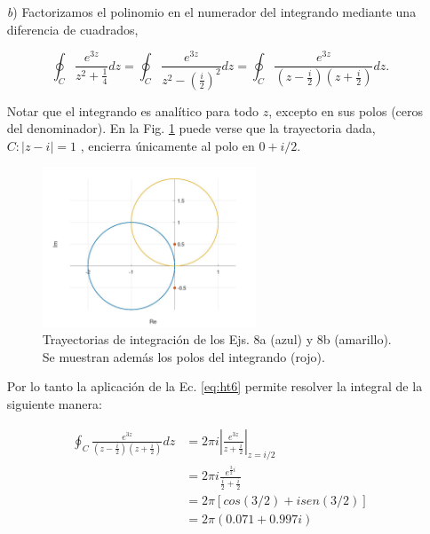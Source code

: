 \documentclass[10pt,a4paper]{article}
\begin{document}
\begin{enumerate}
\begin{enumerate}
\item [\textit{b})]
\label{ej:sol8b}
Factorizamos el polinomio en el numerador del integrando mediante una 
diferencia de cuadrados,

	\begin{equation}
	\oint_{C}\frac{e^{3z}}{z^2+\frac{1}{4}}dz=\oint_{C}\frac{e^{3z}}{z^2-(\frac{i}{2})^2}dz=
	\oint_{C}\frac{e^{3z}}{(z-\frac{i}{2})(z+\frac{i}{2})}dz.
	\end{equation}

Notar que el integrando es anal\'itico para todo $z$, excepto en sus polos 
(ceros del denominador). En la Fig. \ref{fig:sol8} puede verse que la 
trayectoria dada,  $C:|z-i|=1$ , encierra \'unicamente al polo en $0+i/2$.

	\begin{figure}[!htbp]
	\centering
	\includegraphics[width=0.6\textwidth]{8a_b.jpg}
	\caption{Trayectorias de integraci\'on de los Ejs. 8a (azul) y 
	8b (amarillo). Se muestran adem\'as los polos del integrando 
	(rojo).}
	\label{fig:sol8}
	\end{figure}

Por lo tanto la aplicaci\'on de la Ec. \ref{eq:ht6} permite resolver la 
integral 
de 
la siguiente manera:

	\begin{equation}
\begin{split}
\oint_{C}\frac{e^{3z}}{(z-\frac{i}{2})(z+\frac{i}{2})}dz&=2\pi i \left| 
\frac{e^{3z}}{z+\frac{i}{2}} \right|_{z=i/2} \\
&=2\pi i \frac{e^{\frac{3}{2}i}}{\frac{i}{2}+\frac{i}{2}} \\
&=2\pi [cos(3/2)+isen(3/2)]\\
&=\boxed{2\pi(0.071+0.997i)}
\end{split}
\end{equation}	

\end{enumerate}


\end{enumerate}
\end{document}
